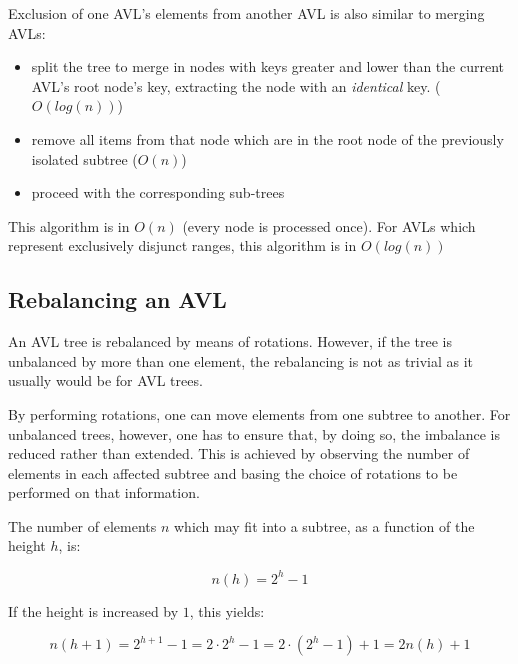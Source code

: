         Exclusion of one AVL's elements from another AVL is also similar to
        merging AVLs:

        \begin{itemize}
            \item split the tree to merge in nodes with keys greater and lower
                than the current AVL's root node's key, extracting the node
                with an \emph{identical} key. ($O(log(n))$)
            \item remove all items from that node which are in the root node
                of the previously isolated subtree ($O(n)$)
            \item proceed with the corresponding sub-trees
        \end{itemize}

        This algorithm is in $O(n)$ (every node is processed once).
        For AVLs which represent exclusively disjunct ranges, this algorithm
        is in $O(log(n))$


    \subsection{Rebalancing an AVL}
    \label{sec:AVL_ops-rebalance}

        An AVL tree is rebalanced by means of rotations.
        However, if the tree is unbalanced by more than one element, the
        rebalancing is not as trivial as it usually would be for AVL trees.

        By performing rotations, one can move elements from one subtree to
        another.
        For unbalanced trees, however, one has to ensure that, by doing so, the
        imbalance is reduced rather than extended.
        This is achieved by observing the number of elements in each affected
        subtree and basing the choice of rotations to be performed on that
        information.

        The number of elements $n$ which may fit into a subtree, as a function
        of the height $h$, is:

        \begin{equation}
            n(h) = 2^h-1
        \end{equation}

        If the height is increased by $1$, this yields:

        \begin{equation}
            n(h+1)
                = 2^{h+1}-1
                = 2\cdot 2^h -1
                = 2\cdot \left(2^h-1\right) +1
                = 2n(h)+1
        \end{equation}

